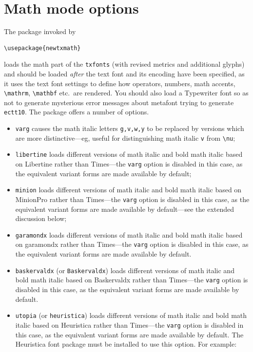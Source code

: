 \documentclass[11pt]{article}
\begin{document}
\section{Math mode options}
The package invoked by
\begin{verbatim}
\usepackage{newtxmath}
\end{verbatim}
loads the math part of the {\tt txfonts} (with revised metrics and additional glyphs) and should be loaded \emph{after} the text font and its encoding have been specified, as it uses the text font settings to define how operators, numbers, math accents, \verb|\mathrm|, \verb|\mathbf| etc.\ are rendered. You should also load a Typewriter font so as not to generate mysterious error messages about \textsf{metafont} trying to generate \texttt{ectt10}. The package offers a number of options.
\begin{itemize}
\item {\tt varg} causes the math italic letters \verb|g,v,w,y| to be replaced by versions which are more distinctive---eg, useful for distinguishing math italic \verb|v| from \verb|\nu|;
\item {\tt libertine} loads different versions of math italic and bold math italic based on \textsf{Libertine} rather than \textsf{Times}---the {\tt varg} option is disabled in this case, as the equivalent variant forms are made available by default;
\item {\tt minion} loads different versions of math italic and bold math italic based on \textsf{MinionPro} rather than \textsf{Times}---the {\tt varg} option is disabled in this case, as the equivalent variant forms are made available by default---see the extended discussion below;
\item {\tt garamondx} loads different versions of math italic and bold math italic based on \textsf{garamondx} rather than \textsf{Times}---the {\tt varg} option is disabled in this case, as the equivalent variant forms are made available by default.
\item {\tt baskervaldx} (or {\tt Baskervaldx}) loads different versions of math italic and bold math italic based on \textsf{Baskervaldx} rather than \textsf{Times}---the {\tt varg} option is disabled in this case, as the equivalent variant forms are made available by default.
\item {\tt utopia} (or {\tt heuristica}) loads different versions of math italic and bold math italic based on \textsf{Heuristica} rather than \textsf{Times}---the {\tt varg} option is disabled in this case, as the equivalent variant forms are made available by default. The Heuristica font package must be installed to use this option. For example:

\end{itemize}
\end{document}
